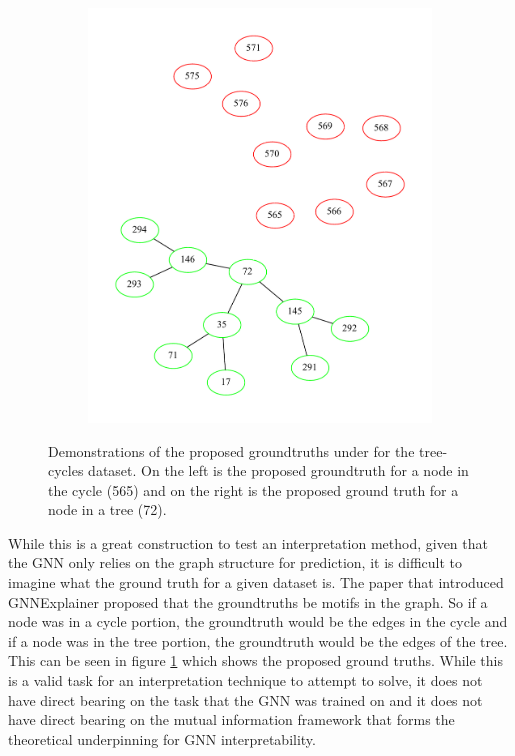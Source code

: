 \begin{figure}[h]
\begin{subfigure}{0.49\textwidth}
		\includegraphics[width=0.9\linewidth]{images/tree-cycles-neg.pdf}
	\end{subfigure}
	\caption{Demonstrations of the proposed groundtruths under \cite{ying_gnnexplainer_2019} for the tree-cycles dataset. On the left is the proposed groundtruth for a node in the cycle (565) and on the right is the proposed ground truth for a node in a tree (72).}
	\label{fig:tree-cycles-proposed-gt}
\end{figure}

While this is a great construction to test an interpretation method, given that the GNN only relies on the graph structure for prediction, it is difficult to imagine what the ground truth for a given dataset is. The paper that introduced GNNExplainer proposed that the groundtruths be motifs in the graph. So if a node was in a cycle portion, the groundtruth would be the edges in the cycle and if a node was in the tree portion, the groundtruth would be the edges of the tree. This can be seen in figure \ref{fig:tree-cycles-proposed-gt} which shows the proposed ground truths. While this is a valid task for an interpretation technique to attempt to solve, it does not have direct bearing on the task that the GNN was trained on and it does not have direct bearing on the mutual information framework that forms the theoretical underpinning for GNN interpretability. 

